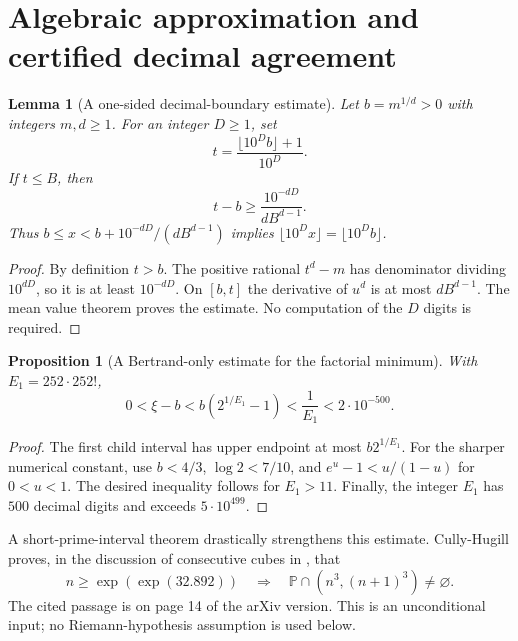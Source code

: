 \documentclass[11pt,a4paper]{article}
\newtheorem{lemma}[theorem]{Lemma}
\newtheorem{proposition}[theorem]{Proposition}
\theoremstyle{definition}
\theoremstyle{remark}
\numberwithin{equation}{section}
\begin{document}
\section{Algebraic approximation and certified decimal agreement}
\begin{lemma}[A one-sided decimal-boundary estimate]\label{enc:lem:decimal-boundary}
Let $b=m^{1/d}>0$ with integers $m,d\ge1$. For an integer $D\ge1$, set
\[
t=\frac{\lfloor10^Db\rfloor+1}{10^D}.
\]
If $t\le B$, then
\[
t-b\ge\frac{10^{-dD}}{dB^{d-1}}.
\]
Thus $b\le x<b+10^{-dD}/(dB^{d-1})$ implies
$\lfloor10^Dx\rfloor=\lfloor10^Db\rfloor$.
\end{lemma}
\begin{proof}
By definition $t>b$. The positive rational $t^d-m$ has denominator dividing $10^{dD}$, so it is at least $10^{-dD}$. On $[b,t]$ the derivative of $u^d$ is at most $dB^{d-1}$. The mean value theorem proves the estimate. No computation of the $D$ digits is required.
\end{proof}

\begin{proposition}[A Bertrand-only estimate for the factorial minimum]\label{enc:prop:bertrand-error}
With $E_1=252\cdot252!$,
\[
0<\xi-b< b(2^{1/E_1}-1)<\frac1{E_1}<2\cdot10^{-500}.
\]
\end{proposition}
\begin{proof}
The first child interval has upper endpoint at most $b2^{1/E_1}$. For the sharper numerical constant, use $b<4/3$, $\log2<7/10$, and $e^u-1<u/(1-u)$ for $0<u<1$. The desired inequality follows for $E_1>11$. Finally, the integer $E_1$ has $500$ decimal digits and exceeds $5\cdot10^{499}$.
\end{proof}

A short-prime-interval theorem drastically strengthens this estimate. Cully-Hugill proves, in the discussion of consecutive cubes in \cite[Section~4]{CullyHugill2023}, that
\begin{equation}\label{enc:eq:cube-input}
n\ge\exp(\exp(32.892))\quad\Longrightarrow\quad
\mathbb P\cap(n^3,(n+1)^3)\ne\varnothing.
\end{equation}
The cited passage is on page 14 of the arXiv version. This is an unconditional input; no Riemann-hypothesis assumption is used below.
\end{document}
